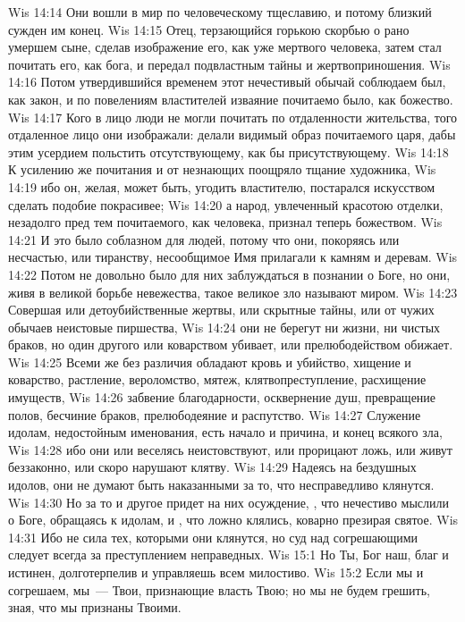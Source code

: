 \vs Wis 14:14 Они вошли в мир по человеческому тщеславию, и потому близкий сужден им конец.
\vs Wis 14:15 Отец, терзающийся горькою скорбью о рано умершем сыне, сделав изображение его, как уже мертвого человека, затем стал почитать его, как бога, и передал подвластным тайны и жертвоприношения.
\vs Wis 14:16 Потом утвердившийся временем этот нечестивый обычай соблюдаем был, как закон, и по повелениям властителей изваяние почитаемо было, как божество.
\vs Wis 14:17 Кого в лицо люди не могли почитать по отдаленности жительства, того отдаленное лицо они изображали: делали видимый образ почитаемого царя, дабы этим усердием польстить отсутствующему, как бы присутствующему.
\vs Wis 14:18 К усилению же почитания и от незнающих поощряло тщание художника,
\vs Wis 14:19 ибо он, желая, может быть, угодить властителю, постарался искусством сделать подобие покрасивее;
\vs Wis 14:20 а народ, увлеченный красотою отделки, незадолго пред тем почитаемого, как человека, признал теперь божеством.
\vs Wis 14:21 И это было соблазном для людей, потому что они, покоряясь или несчастью, или тиранству, несообщимое Имя прилагали к камням и деревам.
\vs Wis 14:22 Потом не довольно было для них заблуждаться в познании о Боге, но они, живя в великой борьбе невежества, такое великое зло называют миром.
\vs Wis 14:23 Совершая или детоубийственные жертвы, или скрытные тайны, или  от чужих обычаев неистовые пиршества,
\vs Wis 14:24 они не берегут ни жизни, ни чистых браков, но один другого или коварством убивает, или прелюбодейством обижает.
\vs Wis 14:25 Всеми же без различия обладают кровь и убийство, хищение и коварство, растление, вероломство, мятеж, клятвопреступление, расхищение имуществ,
\vs Wis 14:26 забвение благодарности, осквернение душ, превращение полов, бесчиние браков, прелюбодеяние и распутство.
\vs Wis 14:27 Служение идолам, недостойным именования, есть начало и причина, и конец всякого зла,
\vs Wis 14:28 ибо они или веселясь неистовствуют, или прорицают ложь, или живут беззаконно, или скоро нарушают клятву.
\vs Wis 14:29 Надеясь на бездушных идолов, они не думают быть наказанными за то, что несправедливо клянутся.
\vs Wis 14:30 Но за то и другое придет на них осуждение, , что нечестиво мыслили о Боге, обращаясь к идолам, и , что ложно клялись, коварно презирая святое.
\vs Wis 14:31 Ибо не сила тех, которыми они клянутся, но суд над согрешающими следует всегда за преступлением неправедных.
\vs Wis 15:1 Но Ты, Бог наш, благ и истинен, долготерпелив и управляешь всем милостиво.
\vs Wis 15:2 Если мы и согрешаем, мы~--- Твои, признающие власть Твою; но мы не будем грешить, зная, что мы признаны Твоими.
